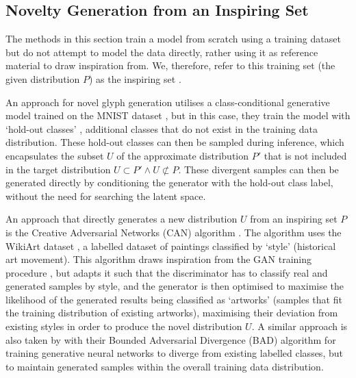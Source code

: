 \subsection{Novelty Generation from an Inspiring Set}
\label{survey:noveltygeneration}

The methods in this section train a model from scratch using a training dataset but do not attempt to model the data directly, rather using it as reference material to draw inspiration from. 
We, therefore, refer to this training set (the given distribution $P$) as the inspiring set \citep{ritchie2007some}.

An approach for novel glyph generation utilises a class-conditional generative model trained on the MNIST dataset \citep{lecun1998gradient}, but in this case, they train the model with `hold-out classes' \citep{cherti2017out}, additional classes that do not exist in the training data distribution. 
These hold-out classes can then be sampled during inference, which encapsulates the subset $U$ of the approximate distribution $P'$ that is not included in the target distribution $U \subset P' \wedge U \not\subset P$. 
These divergent samples can then be generated directly by conditioning the generator with the hold-out class label, without the need for searching the latent space. 

An approach that directly generates a new distribution $U$ from an inspiring set $P$ is the Creative Adversarial Networks (CAN) algorithm \citep{elgammal2017can}. 
The algorithm uses the WikiArt dataset \citep{saleh2016large}, a labelled dataset of paintings classified by `style' (historical art movement). This algorithm draws inspiration from the GAN training procedure \citep{goodfellow2014generative}, but adapts it such that the discriminator has to classify real and generated samples by style, and the generator is then optimised to maximise the likelihood of the generated results being classified as `artworks' (samples that fit the training distribution of existing artworks), maximising their deviation from existing styles in order to produce the novel distribution $U$. A similar approach is also taken by \cite{chelma2022creative} with their Bounded Adversarial Divergence (BAD) algorithm for training generative neural networks to diverge from existing labelled classes, but to maintain generated samples within the overall training data distribution.

